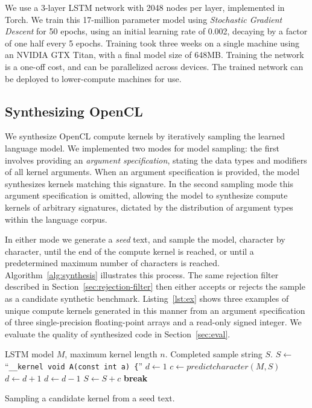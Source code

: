 We use a 3-layer LSTM network with 2048 nodes per layer, implemented in Torch. We train this 17-million parameter model using \textit{Stochastic Gradient Descent} for 50 epochs, using an initial learning rate of 0.002, decaying by a factor of one half every 5 epochs. Training took three weeks on a single machine using an NVIDIA GTX Titan, with a final model size of 648MB. Training the network is a one-off cost, and can be parallelized across devices. The trained network can be deployed to lower-compute machines for use.

\subsection{Synthesizing OpenCL}

We synthesize OpenCL compute kernels by iteratively sampling the learned language model. We implemented two modes for model sampling: the first involves providing an \emph{argument specification}, stating the data types and modifiers of all kernel arguments. When an argument specification is provided, the model synthesizes kernels matching this signature. In the second sampling mode this argument specification is omitted, allowing the model to synthesize compute kernels of arbitrary signatures, dictated by the distribution of argument types within the language corpus.

In either mode we generate a \emph{seed} text, and sample the model, character by character, until the end of the compute kernel is reached, or until a predetermined maximum number of characters is reached. Algorithm~\ref{alg:synthesis} illustrates this process. The same rejection filter described in Section~\ref{sec:rejection-filter} then either accepts or rejects the sample as a candidate synthetic benchmark. Listing~\ref{lst:ex} shows three examples of unique compute kernels generated in this manner from an argument specification of three single-precision floating-point arrays and a read-only signed integer. We evaluate the quality of synthesized code in Section~\ref{sec:eval}.

\begin{algorithm}[t]
  \begin{algorithmic}[1]
    \Require LSTM model $M$, maximum kernel length $n$.
    \Ensure Completed sample string $S$.
    \State $S \gets$``\texttt{\_\_kernel void A(const int a) \{}''
    \State $d \gets 1$
    \State $c \gets predictcharacter(M, S)$
    \State $d \gets d+1$
    \State $d \gets d-1$
    \EndIf
    \State $S \gets S + c$
    \State \textbf{break}
    \EndIf

    \EndFor
  \end{algorithmic}
  \caption{Sampling a candidate kernel from a seed text.}
  \label{alg:synthesis}
\end{algorithm}

